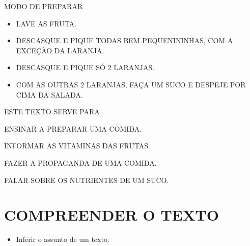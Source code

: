MODO DE PREPARAR

\begin{itemize}
\item
  LAVE AS FRUTA.
\item
  DESCASQUE E PIQUE TODAS BEM PEQUENININHAS, COM A EXCEÇÃO DA LARANJA.
\item
  DESCASQUE E PIQUE SÓ 2 LARANJAS.
\item
  COM AS OUTRAS 2 LARANJAS, FAÇA UM SUCO E DESPEJE POR CIMA DA SALADA.
\end{itemize}



ESTE TEXTO SERVE PARA

\begin{escolha}
\item ENSINAR A PREPARAR UMA COMIDA.

\item INFORMAR AS VITAMINAS DAS FRUTAS.

\item FAZER A PROPAGANDA DE UMA COMIDA.

\item FALAR SOBRE OS NUTRIENTES DE UM SUCO.
\end{escolha}

\chapter{COMPREENDER O TEXTO}


\begin{itemize}
\item Inferir o assunto de um texto.
\end{itemize}


